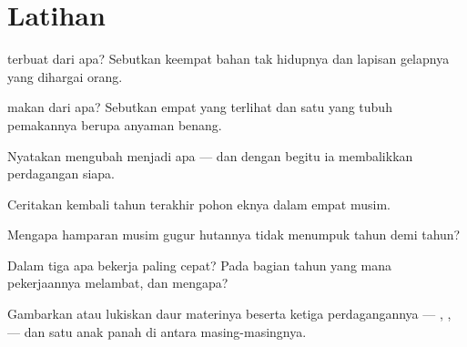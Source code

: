 \section{Latihan}

\begin{exercise}[$\star$]\label{exo:g6:decomposers-and-soil:1}
 terbuat dari apa? Sebutkan keempat bahan tak hidupnya dan
lapisan gelapnya yang dihargai orang.
\end{exercise}

\begin{exercise}[$\star$]\label{exo:g6:decomposers-and-soil:2}
 makan dari apa? Sebutkan empat  yang terlihat dan
satu yang tubuh pemakannya berupa anyaman benang.
\end{exercise}

\begin{exercise}[$\star$]\label{exo:g6:decomposers-and-soil:3}
Nyatakan  mengubah  menjadi apa --- dan dengan
begitu ia membalikkan perdagangan siapa.
\end{exercise}

\begin{exercise}[$\star$]\label{exo:g6:decomposers-and-soil:4}
Ceritakan kembali tahun terakhir  pohon eknya dalam empat musim.
\end{exercise}

\begin{exercise}[$\star$]\label{exo:g6:decomposers-and-soil:5}
Mengapa hamparan musim gugur hutannya tidak menumpuk tahun demi tahun?
\end{exercise}

\begin{exercise}[$\star$]\label{exo:g6:decomposers-and-soil:6}
Dalam tiga  apa  bekerja paling cepat? Pada bagian
tahun yang mana pekerjaannya melambat, dan mengapa?
\end{exercise}

\begin{exercise}[$\star\star$]\label{exo:g6:decomposers-and-soil:7}
Gambarkan atau lukiskan daur materinya beserta ketiga perdagangannya
--- , ,  --- dan satu anak panah di antara
masing-masingnya.
\end{exercise}

